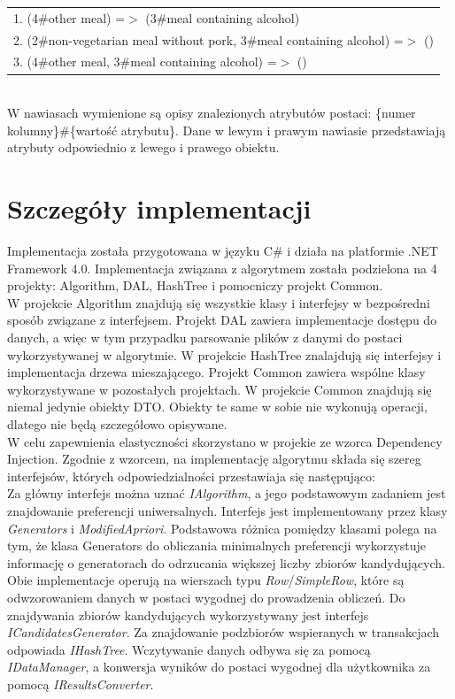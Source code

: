 \documentclass[a4paper,12pt]{article}
\begin{document}
\begin{tabular}{l}
1. (4\#other meal) =$>$ (3\#meal containing alcohol) \\
2. (2\#non-vegetarian meal without pork, 3\#meal containing alcohol) =$>$ () \\
3. (4\#other meal, 3\#meal containing alcohol) =$>$ () \\
\end{tabular}
\\

W nawiasach wymienione są opisy znalezionych atrybutów postaci: \{numer kolumny\}\#\{wartość atrybutu\}. Dane w lewym i prawym nawiasie przedstawiają atrybuty odpowiednio z lewego i prawego obiektu. 
\section{Szczegóły implementacji}

Implementacja została przygotowana w języku C\# i działa na platformie .NET Framework 4.0. Implementacja związana z algorytmem została podzielona na 4 projekty: Algorithm, DAL, HashTree i pomocniczy projekt Common.\\

W projekcie Algorithm znajdują się wszystkie klasy i interfejsy w bezpośredni sposób związane z interfejsem. Projekt DAL zawiera implementacje dostępu do danych, a więc w tym przypadku parsowanie plików z danymi do postaci wykorzystywanej w algorytmie. W projekcie HashTree znalajdują się interfejsy i implementacja drzewa mieszającego. Projekt Common zawiera wspólne klasy wykorzystywane w pozostałych projektach. W projekcie Common znajdują się niemal jedynie obiekty DTO. Obiekty te same w sobie nie wykonują operacji, dlatego nie będą szczegółowo opisywane.\\

W celu zapewnienia elastyczności skorzystano w projekie ze wzorca Dependency Injection. Zgodnie z wzorcem, na implementację algorytmu składa się szereg interfejsów, których odpowiedzialności przestawiaja się następująco:\\

Za główny interfejs można uznać \textit{IAlgorithm}, a jego podstawowym zadaniem jest znajdowanie preferencji uniwersalnych. Interfejs jest implementowany przez klasy \textit{Generators} i \textit{ModifiedApriori}. Podstawowa różnica pomiędzy klasami polega na tym, że klasa Generators do obliczania minimalnych preferencji wykorzystuje informację o generatorach do odrzucania większej liczby zbiorów kandydujących. Obie implementacje operują na wierszach
typu \textit{Row}/\textit{SimpleRow}, które są odwzorowaniem danych w postaci wygodnej do prowadzenia obliczeń. Do znajdywania zbiorów kandydujących wykorzystywany jest interfejs \textit{ICandidatesGenerator}. Za znajdowanie podzbiorów wspieranych w transakcjach odpowiada \textit{IHashTree}. Wczytywanie danych odbywa się za pomocą \textit{IDataManager}, a konwersja wyników do postaci wygodnej dla użytkownika za pomocą \textit{IResultsConverter}.\\
\end{document}
